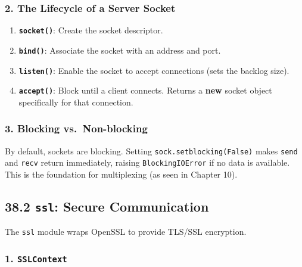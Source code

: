 \hypertarget{the-lifecycle-of-a-server-socket}{%
\subsubsection{2. The Lifecycle of a Server
Socket}\label{the-lifecycle-of-a-server-socket}}

\begin{enumerate}
\def\labelenumi{\arabic{enumi}.}
\tightlist
\item
  \textbf{\passthrough{\lstinline!socket()!}}: Create the socket
  descriptor.
\item
  \textbf{\passthrough{\lstinline!bind()!}}: Associate the socket with
  an address and port.
\item
  \textbf{\passthrough{\lstinline!listen()!}}: Enable the socket to
  accept connections (sets the backlog size).
\item
  \textbf{\passthrough{\lstinline!accept()!}}: Block until a client
  connects. Returns a \textbf{new} socket object specifically for that
  connection.
\end{enumerate}

\hypertarget{blocking-vs.-non-blocking}{%
\subsubsection{3. Blocking
vs.~Non-blocking}\label{blocking-vs.-non-blocking}}

By default, sockets are blocking. Setting
\passthrough{\lstinline!sock.setblocking(False)!} makes
\passthrough{\lstinline!send!} and \passthrough{\lstinline!recv!} return
immediately, raising \passthrough{\lstinline!BlockingIOError!} if no
data is available. This is the foundation for multiplexing (as seen in
Chapter 10).

\hypertarget{ssl-secure-communication}{%
\subsection{\texorpdfstring{38.2 \texttt{ssl}: Secure
Communication}{38.2 ssl: Secure Communication}}\label{ssl-secure-communication}}

The \passthrough{\lstinline!ssl!} module wraps OpenSSL to provide
TLS/SSL encryption.

\hypertarget{sslcontext}{%
\subsubsection{\texorpdfstring{1.
\texttt{SSLContext}}{1. SSLContext}}\label{sslcontext}}

